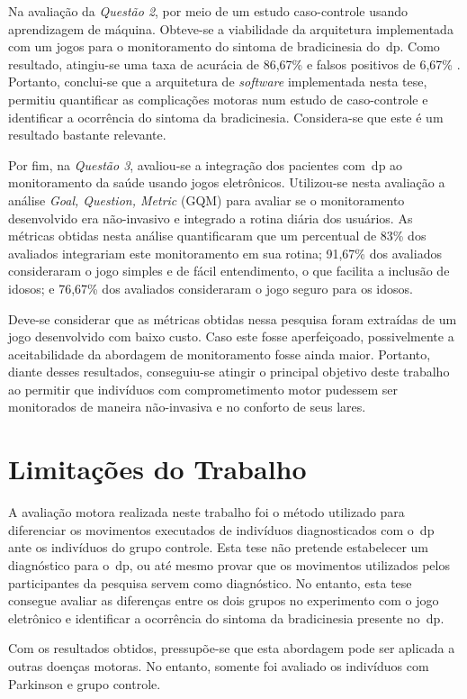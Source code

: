 Na avaliação da \textit{Questão 2}, por meio de um estudo caso-controle usando aprendizagem de máquina. Obteve-se a viabilidade da arquitetura implementada com um jogos para o monitoramento do sintoma de bradicinesia do~\ac{dp}. Como resultado, atingiu-se uma taxa de acurácia de 86,67\% e falsos positivos de 6,67\% . Portanto, conclui-se que a arquitetura de \textit{software} implementada nesta tese, permitiu quantificar as complicações motoras num estudo de caso-controle e identificar a ocorrência do sintoma da bradicinesia. Considera-se que este é um resultado bastante relevante.

Por fim, na \textit{Questão 3}, avaliou-se a integração dos pacientes com~\ac{dp} ao monitoramento da saúde usando jogos eletrônicos. Utilizou-se nesta avaliação a análise \textit{Goal, Question, Metric} (GQM) para avaliar se o monitoramento desenvolvido era não-invasivo e integrado a rotina diária dos usuários. As métricas obtidas nesta análise quantificaram que um percentual de 83\% dos avaliados integrariam este monitoramento em sua rotina; 91,67\% dos avaliados consideraram o jogo simples e de fácil entendimento, o que facilita a inclusão de idosos; e 76,67\% dos avaliados consideraram o jogo seguro para os idosos. 

Deve-se considerar que as métricas obtidas nessa pesquisa foram extraídas de um jogo desenvolvido com baixo custo. Caso este fosse aperfeiçoado, possivelmente a aceitabilidade da abordagem de monitoramento fosse ainda maior. Portanto, diante desses resultados, conseguiu-se atingir o principal objetivo deste trabalho ao permitir que indivíduos com comprometimento motor pudessem ser monitorados de maneira não-invasiva e no conforto de seus lares.


\section{Limitações do Trabalho}\label{section:limitacoes}
A avaliação motora realizada neste trabalho foi o método utilizado para diferenciar os movimentos executados de indivíduos diagnosticados com o~\ac{dp} ante os indivíduos do grupo controle. Esta tese não pretende estabelecer um diagnóstico para o~\ac{dp}, ou até mesmo provar que os movimentos utilizados pelos participantes da pesquisa servem como diagnóstico. No entanto, esta tese consegue avaliar as diferenças entre os dois grupos no experimento com o jogo eletrônico e identificar a ocorrência do sintoma da bradicinesia presente no~\ac{dp}.

Com os resultados obtidos, pressupõe-se que esta abordagem pode ser aplicada a outras doenças motoras. No entanto, somente foi avaliado os indivíduos com Parkinson e grupo controle.

